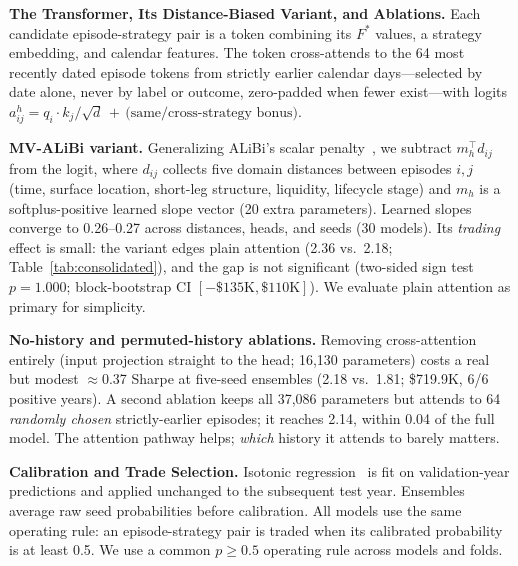 \documentclass[sigconf,review]{acmart}
\begin{document}
\medskip\noindent\textbf{The Transformer, Its Distance-Biased Variant, and Ablations.}
\label{sec:transformer}
Each candidate episode-strategy pair is a token combining its $F^{\ast}$ values, a strategy embedding, and calendar features. The token cross-attends to the 64 most recently dated episode tokens from strictly earlier calendar days---selected by date alone, never by label or outcome, zero-padded when fewer exist---with logits
$a^{h}_{ij}=q_i\!\cdot\!k_j/\sqrt{d}\,+\,\text{(same/cross-strategy bonus)}$.

\noindent\textbf{MV-ALiBi variant.} Generalizing ALiBi's scalar penalty~\cite{press2022alibi}, we subtract $m_h^{\top}d_{ij}$ from the logit, where $d_{ij}$ collects five domain distances between episodes $i,j$ (time, surface location, short-leg structure, liquidity, lifecycle stage) and $m_h$ is a softplus-positive learned slope vector (20 extra parameters). Learned slopes converge to 0.26--0.27 across distances, heads, and seeds (30 models). Its \emph{trading} effect is small: the variant edges plain attention (2.36 vs.\ 2.18; Table~\ref{tab:consolidated}), and the gap is not significant (two-sided sign test $p=1.000$; block-bootstrap CI $[-\$135\text{K},\$110\text{K}]$). We evaluate plain attention as primary for simplicity.

\noindent\textbf{No-history and permuted-history ablations.}
\label{sec:ablations}
Removing cross-attention entirely (input projection straight to the head; 16{,}130 parameters) costs a real but modest $\approx$0.37 Sharpe at five-seed ensembles (2.18 vs.\ 1.81; \$719.9K, 6/6 positive years). A second ablation keeps all 37{,}086 parameters but attends to 64 \emph{randomly chosen} strictly-earlier episodes; it reaches 2.14, within 0.04 of the full model. The attention pathway helps; \emph{which} history it attends to barely matters.

\medskip\noindent\textbf{Calibration and Trade Selection.}
\label{sec:calibration}
Isotonic regression~\cite{zadrozny2002transforming} is fit on validation-year predictions and applied unchanged to the subsequent test year. Ensembles average raw seed probabilities before calibration. All models use the same operating rule: an episode-strategy pair is traded when its calibrated probability is at least 0.5. We use a common $p\ge0.5$ operating rule across models and folds.
\end{document}
